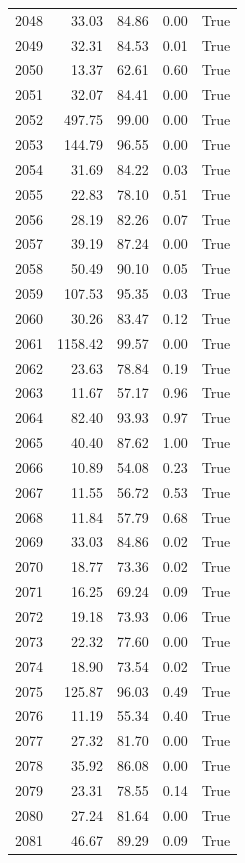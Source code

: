 \begin{longtable}{rrrrr}
2048 & 33.03 & 84.86 & 0.00 & True \\
2049 & 32.31 & 84.53 & 0.01 & True \\
2050 & 13.37 & 62.61 & 0.60 & True \\
2051 & 32.07 & 84.41 & 0.00 & True \\
2052 & 497.75 & 99.00 & 0.00 & True \\
2053 & 144.79 & 96.55 & 0.00 & True \\
2054 & 31.69 & 84.22 & 0.03 & True \\
2055 & 22.83 & 78.10 & 0.51 & True \\
2056 & 28.19 & 82.26 & 0.07 & True \\
2057 & 39.19 & 87.24 & 0.00 & True \\
2058 & 50.49 & 90.10 & 0.05 & True \\
2059 & 107.53 & 95.35 & 0.03 & True \\
2060 & 30.26 & 83.47 & 0.12 & True \\
2061 & 1158.42 & 99.57 & 0.00 & True \\
2062 & 23.63 & 78.84 & 0.19 & True \\
2063 & 11.67 & 57.17 & 0.96 & True \\
2064 & 82.40 & 93.93 & 0.97 & True \\
2065 & 40.40 & 87.62 & 1.00 & True \\
2066 & 10.89 & 54.08 & 0.23 & True \\
2067 & 11.55 & 56.72 & 0.53 & True \\
2068 & 11.84 & 57.79 & 0.68 & True \\
2069 & 33.03 & 84.86 & 0.02 & True \\
2070 & 18.77 & 73.36 & 0.02 & True \\
2071 & 16.25 & 69.24 & 0.09 & True \\
2072 & 19.18 & 73.93 & 0.06 & True \\
2073 & 22.32 & 77.60 & 0.00 & True \\
2074 & 18.90 & 73.54 & 0.02 & True \\
2075 & 125.87 & 96.03 & 0.49 & True \\
2076 & 11.19 & 55.34 & 0.40 & True \\
2077 & 27.32 & 81.70 & 0.00 & True \\
2078 & 35.92 & 86.08 & 0.00 & True \\
2079 & 23.31 & 78.55 & 0.14 & True \\
2080 & 27.24 & 81.64 & 0.00 & True \\
2081 & 46.67 & 89.29 & 0.09 & True \\

\end{longtable}
